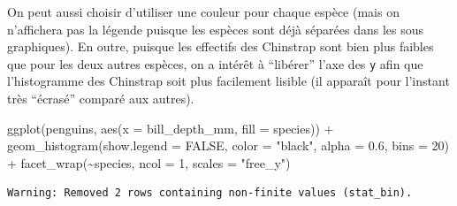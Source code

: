 \documentclass[
  letterpaper,
  DIV=11,
  numbers=noendperiod]{scrreprt}
\newenvironment{Shaded}{\begin{snugshade}}{\end{snugshade}}
\newcommand{\AttributeTok}[1]{\textcolor[rgb]{0.40,0.45,0.13}{#1}}
\newcommand{\ConstantTok}[1]{\textcolor[rgb]{0.56,0.35,0.01}{#1}}
\newcommand{\DecValTok}[1]{\textcolor[rgb]{0.68,0.00,0.00}{#1}}
\newcommand{\FloatTok}[1]{\textcolor[rgb]{0.68,0.00,0.00}{#1}}
\newcommand{\FunctionTok}[1]{\textcolor[rgb]{0.28,0.35,0.67}{#1}}
\newcommand{\NormalTok}[1]{\textcolor[rgb]{0.00,0.23,0.31}{#1}}
\newcommand{\SpecialCharTok}[1]{\textcolor[rgb]{0.37,0.37,0.37}{#1}}
\newcommand{\StringTok}[1]{\textcolor[rgb]{0.13,0.47,0.30}{#1}}
\begin{document}
On peut aussi choisir d'utiliser une couleur pour chaque espèce (mais on
n'affichera pas la légende puisque les espèces sont déjà séparées dans
les sous graphiques). En outre, puisque les effectifs des Chinstrap sont
bien plus faibles que pour les deux autres espèces, on a intérêt à
``libérer'' l'axe des \texttt{y} afin que l'histogramme des Chinstrap
soit plus facilement lisible (il apparaît pour l'instant très ``écrasé''
comparé aux autres).

\begin{Shaded}
\begin{Highlighting}[]
\FunctionTok{ggplot}\NormalTok{(penguins, }\FunctionTok{aes}\NormalTok{(}\AttributeTok{x =}\NormalTok{ bill\_depth\_mm, }\AttributeTok{fill =}\NormalTok{ species)) }\SpecialCharTok{+}
  \FunctionTok{geom\_histogram}\NormalTok{(}\AttributeTok{show.legend =} \ConstantTok{FALSE}\NormalTok{, }\AttributeTok{color =} \StringTok{"black"}\NormalTok{, }
                 \AttributeTok{alpha =} \FloatTok{0.6}\NormalTok{, }\AttributeTok{bins =} \DecValTok{20}\NormalTok{) }\SpecialCharTok{+}
  \FunctionTok{facet\_wrap}\NormalTok{(}\SpecialCharTok{\textasciitilde{}}\NormalTok{species, }\AttributeTok{ncol =} \DecValTok{1}\NormalTok{, }\AttributeTok{scales =} \StringTok{"free\_y"}\NormalTok{)}
\end{Highlighting}
\end{Shaded}

\begin{verbatim}
Warning: Removed 2 rows containing non-finite values (stat_bin).
\end{verbatim}
\end{document}

